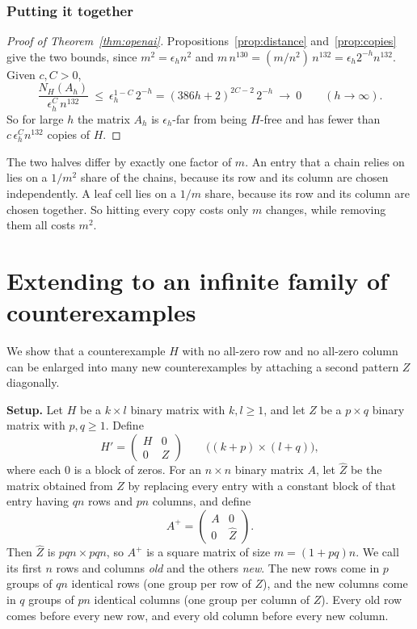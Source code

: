 \documentclass{article}
\theoremstyle{plain}
\theoremstyle{definition}
\begin{document}
\subsubsection*{Putting it together}

\begin{proof}[Proof of Theorem~\ref{thm:openai}]
Propositions~\ref{prop:distance} and~\ref{prop:copies} give the two bounds,
since $m^2=\epsilon_h n^2$ and $m\,n^{130}=(m/n^2)\,n^{132}=\epsilon_h2^{-h}n^{132}$.
Given $c,C>0$,
\[
  \frac{N_H(A_h)}{\epsilon_h^{C}\,n^{132}}\ \le\ \epsilon_h^{1-C}\,2^{-h}
  =(386h+2)^{2C-2}\,2^{-h}\ \longrightarrow\ 0 \qquad(h\to\infty).
\]
So for large $h$ the matrix $A_h$ is $\epsilon_h$-far from being $H$-free and
has fewer than $c\,\epsilon_h^{C}n^{132}$ copies of $H$.
\end{proof}

The two halves differ by exactly one factor of $m$. An entry that a chain relies
on lies on a $1/m^2$ share of the chains, because its row and its column are
chosen independently. A leaf cell lies on a $1/m$ share, because its row and its
column are chosen together. So hitting every copy costs only $m$ changes, while
removing them all costs $m^2$.


\clearpage %
\section*{Extending to an infinite family of counterexamples}
We show that a counterexample $H$ with no all-zero row and no all-zero column can be enlarged
into many new counterexamples by attaching a second pattern $Z$ diagonally.

\medskip
\noindent\textbf{Setup.} Let $H$ be a $k \times l$ binary matrix with $k, l \ge 1$, and let $Z$ be a $p \times q$
binary matrix with $p, q \ge 1$. Define
\[
H' = \begin{pmatrix} H & 0 \\ 0 & Z \end{pmatrix}
\qquad \bigl((k+p) \times (l+q)\bigr),
\]
where each $0$ is a block of zeros. For an $n \times n$ binary matrix $A$, let $\widehat{Z}$ be
the matrix obtained from $Z$ by replacing every entry with a constant block of that entry having
$qn$ rows and $pn$ columns, and define
\[
A^+ = \begin{pmatrix} A & 0 \\ 0 & \widehat{Z} \end{pmatrix}.
\]
Then $\widehat{Z}$ is $pqn \times pqn$, so $A^+$ is a square matrix of size $m = (1+pq)n$. We
call its first $n$ rows and columns \emph{old} and the others \emph{new}. The new rows come in
$p$ groups of $qn$ identical rows (one group per row of $Z$), and the new columns come in $q$
groups of $pn$ identical columns (one group per column of $Z$). Every old row comes before every
new row, and every old column before every new column.
\end{document}
